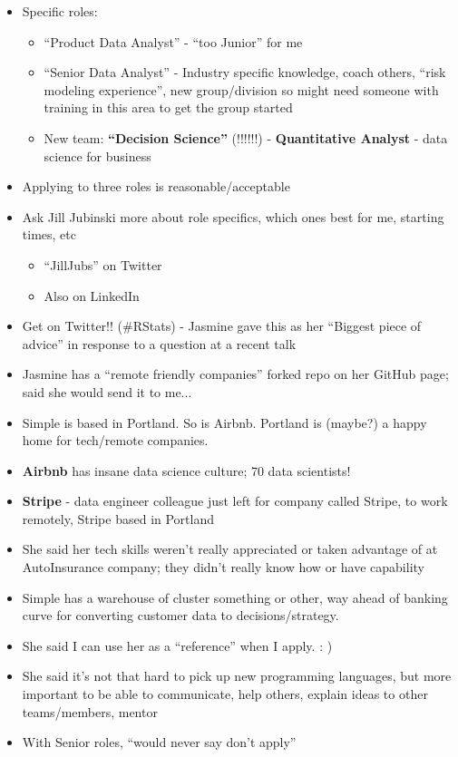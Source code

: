 \documentclass{article}
\begin{document}
\begin{itemize}
\item Specific roles:
  \begin{itemize}
  \item ``Product Data Analyst'' - ``too Junior'' for me
  \item ``Senior Data Analyst'' - Industry specific knowledge, coach others, ``risk modeling experience'', new group/division so might need someone with training in this area to get the group started
  \item New team: {\bf ``Decision Science''} (!!!!!!) - {\bf Quantitative Analyst} - data science for business
  \end{itemize}
\item Applying to three roles is reasonable/acceptable
\item Ask Jill Jubinski more about role specifics, which ones best for me, starting times, etc
  \begin{itemize}
  \item ``JillJubs'' on Twitter
  \item Also on LinkedIn
  \end{itemize}
\item Get on Twitter!! (\#RStats) - Jasmine gave this as her ``Biggest piece of advice'' in response to a question at a recent talk
\item Jasmine has a ``remote friendly companies'' forked repo on her GitHub page; said she would send it to me...
\item Simple is based in Portland. So is Airbnb. Portland is (maybe?) a happy home for tech/remote companies.
\item {\bf Airbnb} has insane data science culture; 70 data scientists!
\item {\bf Stripe} - data engineer colleague just left for company called Stripe, to work remotely, Stripe based in Portland
\item She said her tech skills weren't really appreciated or taken advantage of at AutoInsurance company; they didn't really know how or have capability
\item Simple has a warehouse of cluster something or other, way ahead of banking curve for converting customer data to decisions/strategy.
\item She said I can use her as a ``reference'' when I apply. : )
\item She said it's not that hard to pick up new programming languages, but more important to be able to communicate, help others, explain ideas to other teams/members, mentor
\item With Senior roles, ``would never say don't apply''
\end{itemize}
\end{document}
